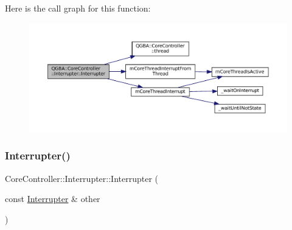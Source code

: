 Here is the call graph for this function\+:
\nopagebreak
\begin{figure}[H]
\begin{center}
\leavevmode
\includegraphics[width=350pt]{class_q_g_b_a_1_1_core_controller_1_1_interrupter_a049d273dc9f81e8f92f063dab82851e0_cgraph}
\end{center}
\end{figure}
\mbox{\label{class_q_g_b_a_1_1_core_controller_1_1_interrupter_a8cd26448930b7b618dfb7badcb9568e3}} 
\subsubsection{\texorpdfstring{Interrupter()}{Interrupter()}\hspace{0.1cm}{\footnotesize\ttfamily [3/3]}}
{\footnotesize\ttfamily Core\+Controller\+::\+Interrupter\+::\+Interrupter (\begin{DoxyParamCaption}\item[{const \mbox{\hyperlink{class_q_g_b_a_1_1_core_controller_1_1_interrupter}{Interrupter}} \&}]{other }\end{DoxyParamCaption})}

